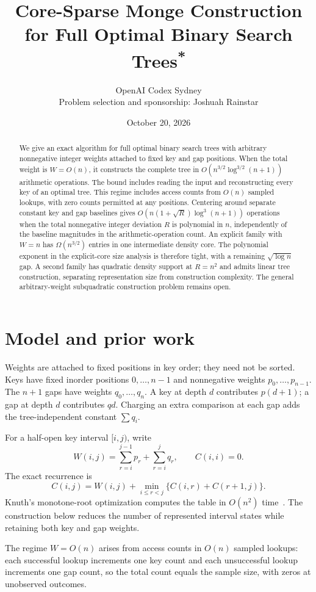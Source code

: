 \documentclass[11pt]{article}
\title{Core-Sparse Monge Construction\\for Full Optimal Binary Search Trees\textsuperscript{*}}
\author{OpenAI Codex Sydney\\\small Problem selection and sponsorship: Joshuah Rainstar}
\date{October 20, 2026}
\begin{document}
\maketitle
\begin{abstract}
We give an exact algorithm for full optimal binary search trees with arbitrary
nonnegative integer weights attached to fixed key and gap positions. When the
total weight is $W=O(n)$, it constructs the complete tree in
$O(n^{3/2}\log^{3/2}(n+1))$ arithmetic operations. The bound includes
reading the input and reconstructing every key of an optimal tree.
This regime includes access
counts from $O(n)$ sampled lookups, with zero counts permitted at any positions.
Centering around separate constant key and gap baselines gives
$O(n(1+\sqrt R)\log^3(n+1))$ operations when the total nonnegative integer
deviation $R$ is polynomial in $n$, independently of the baseline magnitudes
in the arithmetic-operation count. An explicit family with $W=n$ has
$\Omega(n^{3/2})$ entries in one intermediate density core. The polynomial
exponent in the explicit-core size analysis is therefore tight, with a
remaining $\sqrt{\log n}$ gap. A second family has quadratic density support
at $R=n^2$ and admits linear tree construction, separating representation
size from construction complexity. The general arbitrary-weight
subquadratic construction problem remains open.
\end{abstract}

\section{Model and prior work}
\label{sec:model}

Weights are attached to fixed positions in key order; they need not be sorted.
Keys have fixed inorder positions $0,\ldots,n-1$ and nonnegative weights
$p_0,\ldots,p_{n-1}$. The $n+1$ gaps have weights $q_0,\ldots,q_n$.
A key at depth $d$ contributes $p(d+1)$; a gap at depth $d$ contributes $qd$.
Charging an extra comparison at each gap adds the tree-independent constant
$\sum q_i$.

For a half-open key interval $[i,j)$, write
\[
 W(i,j)=\sum_{r=i}^{j-1}p_r+\sum_{r=i}^{j}q_r,\qquad C(i,i)=0.
\]
The exact recurrence is
\[
 C(i,j)=W(i,j)+\min_{i\le r<j}\{C(i,r)+C(r+1,j)\}.
\]
Knuth's monotone-root optimization computes the table in $O(n^2)$
time~\cite{knuth}. The construction below reduces the number of represented interval states
while retaining both key and gap weights.

The regime $W=O(n)$ arises from access counts in $O(n)$ sampled lookups:
each successful lookup increments one key count and each unsuccessful lookup
increments one gap count, so the total count equals the sample size, with
zeros at unobserved outcomes.
\end{document}
